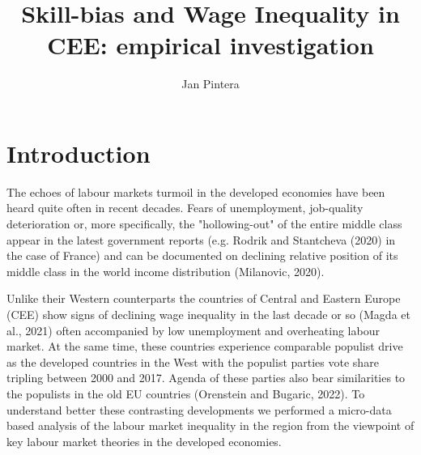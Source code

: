 \documentclass{article}
\title{Skill-bias and Wage Inequality in CEE: empirical investigation}
\author{Jan Pintera}
\date{}
\begin{document}
\maketitle
\section{Introduction}
The echoes of labour markets turmoil in the developed economies have been heard quite often in recent decades. Fears of unemployment, job-quality deterioration or, more specifically, the "hollowing-out" of the entire middle class appear in the latest government reports (e.g. Rodrik and Stantcheva (2020) in the case of France) and can be documented on declining relative position of its middle class in the world income distribution (Milanovic, 2020).

Unlike their Western counterparts the countries of Central and Eastern Europe (CEE) show signs of declining wage inequality in the last decade or so (Magda et al., 2021) often accompanied by low unemployment and overheating labour market. At the same time, these countries experience comparable populist drive as the developed countries in the West with the populist parties vote share tripling between 2000 and 2017. Agenda of these parties also bear similarities to the populists in the old EU countries (Orenstein and Bugaric, 2022). To understand better these contrasting developments we performed a micro-data based analysis of the labour market inequality in the region from the viewpoint of key labour market theories in the developed economies.
\end{document}
